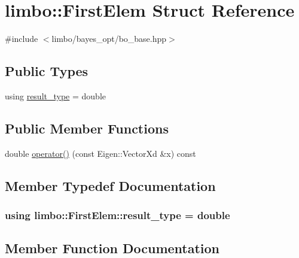 \hypertarget{structlimbo_1_1_first_elem}{}\section{limbo\+:\+:First\+Elem Struct Reference}
\label{structlimbo_1_1_first_elem}


{\ttfamily \#include $<$limbo/bayes\+\_\+opt/bo\+\_\+base.\+hpp$>$}

\subsection*{Public Types}
\begin{DoxyCompactItemize}
\item 
using \hyperlink{structlimbo_1_1_first_elem_a615df66bdce08d6cb405fbe4710e3953}{result\+\_\+type} = double
\end{DoxyCompactItemize}
\subsection*{Public Member Functions}
\begin{DoxyCompactItemize}
\item 
double \hyperlink{structlimbo_1_1_first_elem_a6816ea8e21acec76f91542776ab02422}{operator()} (const Eigen\+::\+Vector\+Xd \&x) const 
\end{DoxyCompactItemize}


\subsection{Member Typedef Documentation}
\subsubsection[{\texorpdfstring{result\+\_\+type}{result_type}}]{\setlength{\rightskip}{0pt plus 5cm}using {\bf limbo\+::\+First\+Elem\+::result\+\_\+type} =  double}\hypertarget{structlimbo_1_1_first_elem_a615df66bdce08d6cb405fbe4710e3953}{}\label{structlimbo_1_1_first_elem_a615df66bdce08d6cb405fbe4710e3953}


\subsection{Member Function Documentation}
